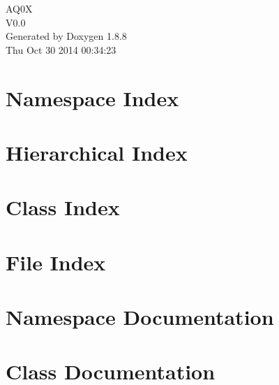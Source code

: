 \documentclass[twoside]{book}
\newcommand{\+}{\discretionary{\mbox{\scriptsize$\hookleftarrow$}}{}{}}
\newcommand{\clearemptydoublepage}{%
  \newpage{\pagestyle{empty}\cleardoublepage}%
}
\begin{document}
\hypersetup{pageanchor=false,
             bookmarks=true,
             bookmarksnumbered=true,
             pdfencoding=unicode
            }
\begin{titlepage}
\vspace*{7cm}
\begin{center}%
{\Large A\+Q0\+X \\[1ex]\large V0.\+0 }\\
\vspace*{1cm}
{\large Generated by Doxygen 1.8.8}\\
\vspace*{0.5cm}
{\small Thu Oct 30 2014 00:34:23}\\
\end{center}
\end{titlepage}
\clearemptydoublepage
\tableofcontents
\clearemptydoublepage
{}
\hypersetup{pageanchor=true}

\chapter{Namespace Index}

\chapter{Hierarchical Index}

\chapter{Class Index}

\chapter{File Index}

\chapter{Namespace Documentation}

\chapter{Class Documentation}



















\end{document}
